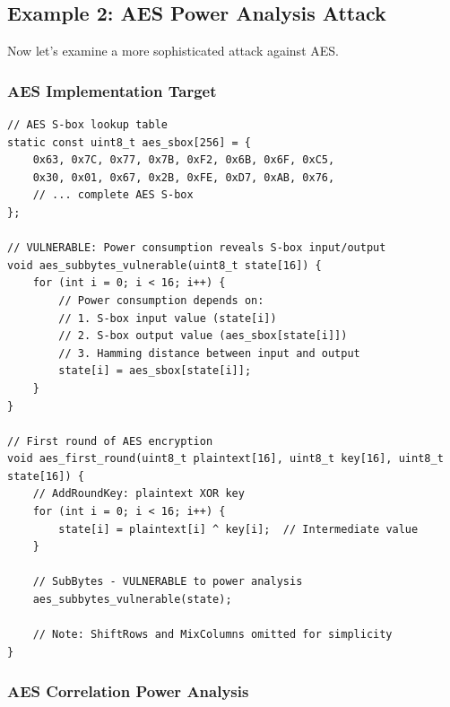 \documentclass[11pt,a4paper]{article}
\theoremstyle{definition}
\begin{document}
\subsection{Example 2: AES Power Analysis Attack}

Now let's examine a more sophisticated attack against AES.

\subsubsection{AES Implementation Target}

\begin{lstlisting}[caption={AES SubBytes Implementation (Vulnerable to Power Analysis)}]
// AES S-box lookup table
static const uint8_t aes_sbox[256] = {
    0x63, 0x7C, 0x77, 0x7B, 0xF2, 0x6B, 0x6F, 0xC5,
    0x30, 0x01, 0x67, 0x2B, 0xFE, 0xD7, 0xAB, 0x76,
    // ... complete AES S-box
};

// VULNERABLE: Power consumption reveals S-box input/output
void aes_subbytes_vulnerable(uint8_t state[16]) {
    for (int i = 0; i < 16; i++) {
        // Power consumption depends on:
        // 1. S-box input value (state[i])
        // 2. S-box output value (aes_sbox[state[i]])  
        // 3. Hamming distance between input and output
        state[i] = aes_sbox[state[i]];
    }
}

// First round of AES encryption
void aes_first_round(uint8_t plaintext[16], uint8_t key[16], uint8_t state[16]) {
    // AddRoundKey: plaintext XOR key
    for (int i = 0; i < 16; i++) {
        state[i] = plaintext[i] ^ key[i];  // Intermediate value
    }
    
    // SubBytes - VULNERABLE to power analysis
    aes_subbytes_vulnerable(state);
    
    // Note: ShiftRows and MixColumns omitted for simplicity
}
\end{lstlisting}

\subsubsection{AES Correlation Power Analysis}
\end{document}

